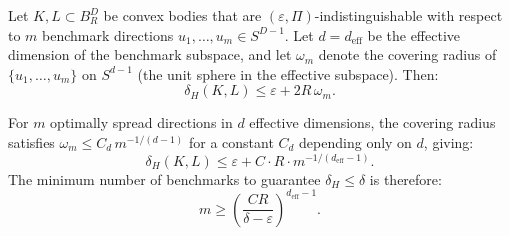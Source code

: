 

\begin{theorem}
\label{thm:indist-corrected}
Let $K, L \subset B_R^D$ be convex bodies that are $(\varepsilon, \Pi)$-indistinguishable with respect to $m$ benchmark directions $u_1, \ldots, u_m \in S^{D-1}$. Let $d = d_{\mathrm{eff}}$ be the effective dimension of the benchmark subspace, and let $\omega_m$ denote the covering radius of $\{u_1, \ldots, u_m\}$ on $S^{d-1}$ (the unit sphere in the effective subspace). Then:
\[
  \delta_H(K, L) \leq \varepsilon + 2R\,\omega_m.
\]

For $m$ optimally spread directions in $d$ effective dimensions, the covering radius satisfies $\omega_m \leq C_d \, m^{-1/(d-1)}$ for a constant $C_d$ depending only on $d$, giving:
\[
  \boxed{\delta_H(K, L) \leq \varepsilon + C \cdot R \cdot m^{-1/(d_{\mathrm{eff}} - 1)}.}
\]
The minimum number of benchmarks to guarantee $\delta_H \leq \delta$ is therefore:
\[
  m \geq \left(\frac{CR}{\delta - \varepsilon}\right)^{d_{\mathrm{eff}} - 1}.
\]
\end{theorem}

